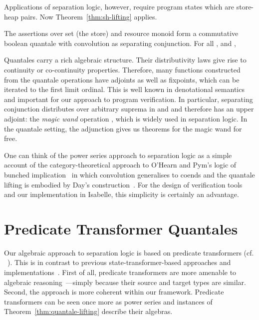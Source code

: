 \documentclass[twoside,runningheads,envcountsame,envcountsect,oribibl,orivec]{llncs}
\begin{document}
Applications of separation logic, however, require program states
which are store-heap pairs.  Now Theorem~\ref{thm:sh-lifting} applies.
\begin{corollary}\label{cor:heap-ass-quantale}
  The assertions  over set  (the store) and
  resource monoid  form a commutative boolean quantale with
  convolution as separating conjunction. For all ,  and ,

\end{corollary}

Quantales carry a rich algebraic structure. Their distributivity laws
give rise to continuity or co-continuity properties.  Therefore, many
functions constructed from the quantale operations have adjoints as
well as fixpoints, which can be iterated to the first limit
ordinal. This is well known in denotational semantics and important
for our approach to program verification.  In particular, separating
conjunction  distributes over arbitrary suprema in
 and  and therefore has an upper
adjoint: the \emph{magic wand} operation , which is widely used
in separation logic. In the quantale setting, the adjunction gives us
theorems for the magic wand for free.

One can think of the power series approach to separation logic as a
simple account of the category-theoretical approach to O'Hearn and
Pym's logic of bunched implication~\cite{OHearnP99} in which
convolution generalises to coends and the quantale lifting is embodied
by Day's construction~\cite{Day}. For the design of verification tools
and our implementation in Isabelle, this simplicity is certainly an
advantage.



\section{Predicate Transformer Quantales} \label{S:pt_quantale}

Our algebraic approach to separation logic is based on predicate
transformers (cf. ~\cite{BvW99-book}).  This is in contrast to
previous state-transformer-based approaches and
implementations~\cite{COY07,NICTA,Tuerk}.  First of all, predicate
transformers are more amenable to algebraic
reasoning~\cite{BvW99-book}---simply because their source and target
types are similar. Second, the approach is more coherent within our
framework.  Predicate transformers can be seen once more as power
series and instances of Theorem~\ref{thm:quantale-lifting} describe
their algebras.
\end{document}
